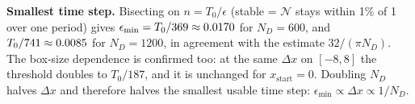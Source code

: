 \documentclass[11pt]{article}
\begin{document}
\textbf{Smallest time step.} Bisecting on $n=T_0/\epsilon$ (stable = $\mathcal N$ stays within 1\% of 1 over one period) gives
$\epsilon_\mathrm{min} = T_0/369 \approx 0.0170$ for $N_D=600$, and $T_0/741 \approx 0.0085$ for $N_D=1200$,
in agreement with the estimate $32/(\pi N_D)$.
The box-size dependence is confirmed too: at the same $\Delta x$ on $[-8,8]$ the threshold doubles to $T_0/187$, and it is unchanged for $x_\mathrm{start}=0$.
Doubling $N_D$ halves $\Delta x$ and therefore halves the smallest usable time step: $\epsilon_\mathrm{min}\propto\Delta x\propto 1/N_D$.
\end{document}
